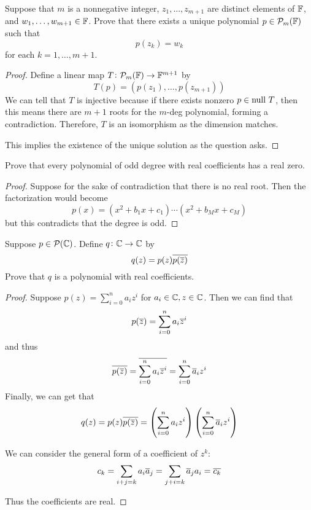 \documentclass{extarticle}
\begin{document}
\begin{problem}{7}
    Suppose that \(m\) is a nonnegative integer, \(z_1, \ldots, z_{m+1}\) are distinct elements 
    of \(\mathbb{F}\), and \(w_1, \ldots, w_{m+1} \in \mathbb{F}\). Prove that there exists a unique polynomial 
    \(p \in \mathcal{P}_m(\mathbb{F})\) such that 
    \[p(z_k) = w_k\]
    for each \(k = 1, \ldots, m+1\). 
\end{problem}

\begin{proof}
Define a linear map \(T \colon \mathcal{P}_m(\mathbb{F}) \to \mathbb{F}^{m+1}\) by 
\[T(p) = (p(z_1), \ldots, p(z_{m+1}))\]
We can tell that \(T\) is injective because if there exists nonzero \(p \in \text{null } T\), then 
this means there are \(m+1\) roots for the \(m\)-deg polynomial, forming a contradiction. Therefore, 
\(T\) is an isomorphism as the dimension matches. 

This implies the existence of the unique solution as the question asks. 
\end{proof}

\begin{problem}{9}
    Prove that every polynomial of odd degree with real coefficients has a real zero.
\end{problem}

\begin{proof}
Suppose for the sake of contradiction that there is no real root. Then the factorization would become 
\[p(x) = (x^2 + b_1x + c_1) \cdots (x^2 + b_Mx + c_M)\]
but this contradicts that the degree is odd. 
\end{proof}

\begin{problem}{11}
    Suppose \(p \in \mathcal{P}(\mathbb{C})\). Define \(q \colon \mathbb{C} \to \mathbb{C}\) by 
    \[q(z) = p(z) \overline{p(\overline{z})}\]
    Prove that \(q\) is a polynomial with real coefficients. 
\end{problem}

\begin{proof}
Suppose \(p(z) = \sum_{i=0}^{n} a_i z^i\) for \(a_i \in \mathbb{C}, z \in \mathbb{C}\). Then we can find that 
\[p(\overline{z}) = \sum_{i=0}^{n}a_i \overline{z}^i\]
and thus  
\[\overline{p(\overline{z})} = \overline{\sum_{i=0}^{n}a_i \overline{z}^i}
= \sum_{i=0}^{n} \overline{a}_i z^i\]
Finally, we can get that 
\[q(z) = p(z)\overline{p(\overline{z})} 
= \left(\sum_{i=0}^{n}a_i z^i \right) \left(\sum_{i=0}^{n}\overline{a}_i z^i \right)\]

We can consider the general form of a coefficient of \(z^k\):
\[c_k = \sum_{i+j=k} a_i \overline{a}_j = \sum_{j+i=k} \overline{a}_j a_i = \overline{c_k}\]

Thus the coefficients are real.
\end{proof}
\end{document}
